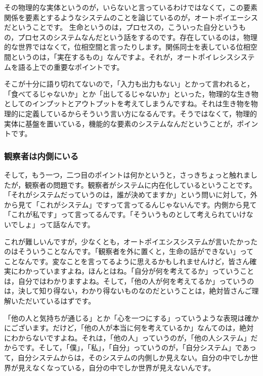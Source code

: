 \documentclass{ltjsbook}
\begin{document}
その物理的な実体というのが，いらないと言っているわけではなくて，この要素関係を要素とするようなシステムのことを論じているのが，オートポイエーシスだということです。
生命というのは，プロセスの，こういった自分というもの，プロセスのシステムなんだという話をするのです。存在しているのは，物理的な世界ではなくて，位相空間と言ったりします。関係同士を表している位相空間というのは，「実在するもの」なんですよ。それが，オートポイレシスシステムを語る上での重要なポイントです。

そこが十分に語り切れてないので，「入力も出力もない」とかって言われると，「食べてるじゃないか」とか「出してるじゃないか」といった，物理的な生き物としてのインプットとアウトプットを考えてしまうんですね。それは生き物を物理的に定義しているからそういう言い方になるんです。そうではなくて，物理的実体に基盤を置いている，機能的な要素のシステムなんだということが，ポイントです。

\subsubsection{観察者は内側にいる}

そして，もう一つ，二つ目のポイントは何かというと，さっきちょっと触れましたが，観察者の問題です。観察者がシステムに内在化しているということです。
「それがシステムだっていうのは，誰が決めてますか」という問いに対して，外から見て「これがシステム」ですって言ってるんじゃないんです。内側から見て「これが私です」って言ってるんです。「そういうものとして考えられていけないでしょ」って話なんです。

これが難しいんですが，少なくとも，オートポイエシスシステムが言いたかったのはそういうことなんです。「観察者を外に置くと，生命の話ができない」ってことなんです。変なことを言ってるように思えるかもしれませんけど，皆さん確実にわかっていますよね，ほんとはね。「自分が何を考えてるか」っていうことは，自分ではわかりますよね。そして，「他の人が何を考えてるか」っていうのは，決して知り得ない，わかり得ないものなのだということは，絶対皆さんご理解いただいているはずです。

「他の人と気持ちが通じる」とか「心を一つにする」っていうような表現は確かにございます。だけど，「他の人が本当に何を考えているか」なんてのは，絶対にわからないですよね。それは，「他の人」っていうのが，「他の人システム」だからです。そして，「僕」，「私」，「自分」っていうのが，「自分システム」であって，自分システムからは，そのシステムの内側しか見えない。自分の中でしか世界が見えなくなっている，自分の中でしか世界が見えないんです。
\end{document}
